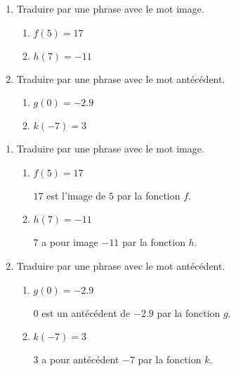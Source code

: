 \begin{exercice}    
    \vspace*{-3mm}
    \begin{enumerate}
        \item Traduire par une phrase avec le mot image.
        \vspace*{-3mm}
        \begin{multicols}{2}
            \begin{enumerate}
                \item $f(5)=17$
                \item $h(7)=-11$
            \end{enumerate}               
        \end{multicols}
        \item Traduire par une phrase avec le mot antécédent.
        \vspace*{-3mm}
        \begin{multicols}{2}
            \begin{enumerate}
                \item $g(0)=\num{-2.9}$
                \item $k(-7)=3$
            \end{enumerate}
        \end{multicols}
    \end{enumerate}    
\end{exercice}
\begin{corrige}
    \begin{enumerate}
        \item Traduire par une phrase avec le mot image.
        \begin{enumerate}
            \item $f(5)=17$ 
            
            {\red $17$ est l'image de $5$ par la fonction $f$.}
            \item $h(7)=-11$ 
            
            {\red $7$ a pour image $-11$ par la fonction $h$.}
        \end{enumerate}
        \item Traduire par une phrase avec le mot antécédent.
        \begin{enumerate}
            \item $g(0)=-2.9$
            
            {\red $0$ est un antécédent de $-2.9$ par la fonction $g$.}
            \item $k(-7)=3$
            
            {\red $3$ a pour antécédent $-7$ par la fonction $k$.}
        \end{enumerate}
    \end{enumerate}
\end{corrige}
